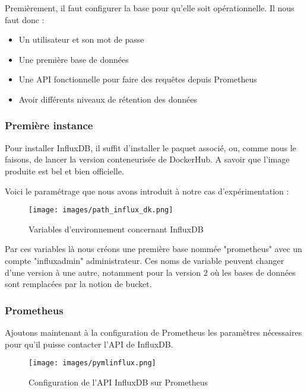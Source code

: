\documentclass[oneside,12pt]{report}
\begin{document}
Premièrement, il faut configurer la base pour qu'elle soit opérationnelle. Il nous faut donc :
\begin{itemize}
    \item Un utilisateur et son mot de passe
    \item Une première base de données
    \item Une API fonctionnelle pour faire des requêtes depuis Prometheus
    \item Avoir différents niveaux de rétention des données
\end{itemize}

\subsubsection{Première instance}
Pour installer InfluxDB, il suffit d'installer le paquet associé, ou, comme nous le faisons, de lancer la version conteneurisée de DockerHub. A savoir que l'image produite est bel et bien officielle. \newline

Voici le paramétrage que nous avons introduit à notre cas d'expérimentation : \newline

\begin{figure}[H]
    \centering
    \texttt{[image: images/path\_influx\_dk.png]}
    \caption{Variables d'environnement concernant InfluxDB}
    \label{fig:mesh1}
\end{figure}

Par ces variables là nous créons une première base nommée "prometheus" avec un compte "influxadmin" administrateur. Ces noms de variable peuvent changer d'une version à une autre, notamment pour la version 2 où les bases de données sont remplacées par la notion de bucket.\newline

\subsubsection{Prometheus}

Ajoutons maintenant à la configuration de Prometheus les paramètres nécessaires pour qu'il puisse contacter l'API de InfluxDB.\newline

\begin{figure}[H]
    \centering
    \texttt{[image: images/pymlinflux.png]}
    \caption{Configuration de l'API InfluxDB sur Prometheus}
    \label{fig:mesh1}
\end{figure}
\end{document}
